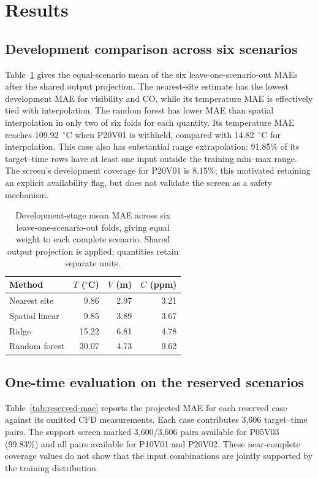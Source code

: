 \documentclass[preprint,12pt,authoryear]{elsarticle}
\begin{document}
\section{Results}
\subsection{Development comparison across six scenarios}
Table~\ref{tab:development-mae} gives the equal-scenario mean of the six
leave-one-scenario-out MAEs after the shared output projection. The
nearest-site estimate has the lowest development MAE for visibility and
CO, while its temperature MAE is effectively tied with interpolation.
The random forest has lower MAE than spatial interpolation in only two
of six folds for each quantity. Its temperature MAE reaches 109.92~$^{\circ}$C
when P20V01 is withheld, compared with 14.82~$^{\circ}$C for interpolation.
This case also has substantial range extrapolation: 91.85\% of its
target--time rows have at least one input outside the training min--max
range. The screen's development coverage for P20V01 is 8.15\%; this
motivated retaining an explicit availability flag, but does not validate
the screen as a safety mechanism.

\begin{table}[htbp]\centering\small
\caption{Development-stage mean MAE across six leave-one-scenario-out
folds, giving equal weight to each complete scenario. Shared output
projection is applied; quantities retain separate units.}
\label{tab:development-mae}
\begin{tabular}{@{}lrrr@{}}\toprule
Method & $T$ ($^{\circ}$C) & $V$ (m) & $C$ (ppm)\\\midrule
Nearest site & 9.86 & 2.97 & 3.21\\
Spatial linear & 9.85 & 3.89 & 3.67\\
Ridge & 15.22 & 6.81 & 4.78\\
Random forest & 30.07 & 4.73 & 9.62\\
\bottomrule
\end{tabular}
\end{table}

\subsection{One-time evaluation on the reserved scenarios}
Table~\ref{tab:reserved-mae} reports the projected MAE for each reserved
case against its omitted CFD measurements. Each case contributes 3,606
target--time pairs. The support screen marked 3,600/3,606 pairs available
for P05V03 (99.83\%) and all pairs available for P10V01 and P20V02.
These near-complete coverage values do not show that the input combinations
are jointly supported by the training distribution.
\end{document}
